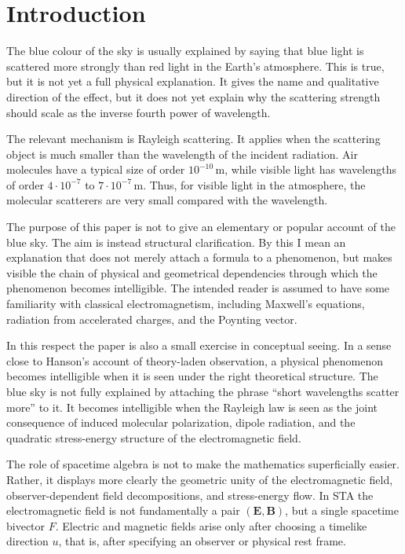 \documentclass[11pt,a4paper]{article}
\begin{document}
\section{Introduction}

The blue colour of the sky is usually explained by saying that blue light is
scattered more strongly than red light in the Earth's atmosphere. This is
true, but it is not yet a full physical explanation. It gives the name and
qualitative direction of the effect, but it does not yet explain why the
scattering strength should scale as the inverse fourth power of wavelength.

The relevant mechanism is Rayleigh scattering. It applies when the scattering
object is much smaller than the wavelength of the incident radiation. Air
molecules have a typical size of order \(10^{-10}\,\mathrm{m}\), while visible
light has wavelengths of order \(4\cdot 10^{-7}\) to
\(7\cdot 10^{-7}\,\mathrm{m}\). Thus, for visible light in the atmosphere, the
molecular scatterers are very small compared with the wavelength.

The purpose of this paper is not to give an elementary or popular account of
the blue sky. The aim is instead structural clarification. By this I mean an
explanation that does not merely attach a formula to a phenomenon, but makes
visible the chain of physical and geometrical dependencies through which the
phenomenon becomes intelligible. The intended reader is assumed to have some
familiarity with classical electromagnetism, including Maxwell's equations,
radiation from accelerated charges, and the Poynting vector.

In this respect the paper is also a small exercise in conceptual seeing. In a
sense close to Hanson's account of theory-laden observation, a physical
phenomenon becomes intelligible when it is seen under the right theoretical
structure. The blue sky is not fully explained by attaching the phrase
``short wavelengths scatter more'' to it. It becomes intelligible when the
Rayleigh law is seen as the joint consequence of induced molecular
polarization, dipole radiation, and the quadratic stress-energy structure of
the electromagnetic field.

The role of spacetime algebra is not to make the mathematics superficially
easier. Rather, it displays more clearly the geometric unity of the
electromagnetic field, observer-dependent field decompositions, and
stress-energy flow. In STA the electromagnetic field is not fundamentally a
pair \((\mathbf{E},\mathbf{B})\), but a single spacetime bivector \(F\).
Electric and magnetic fields arise only after choosing a timelike direction
\(u\), that is, after specifying an observer or physical rest frame.
\end{document}
